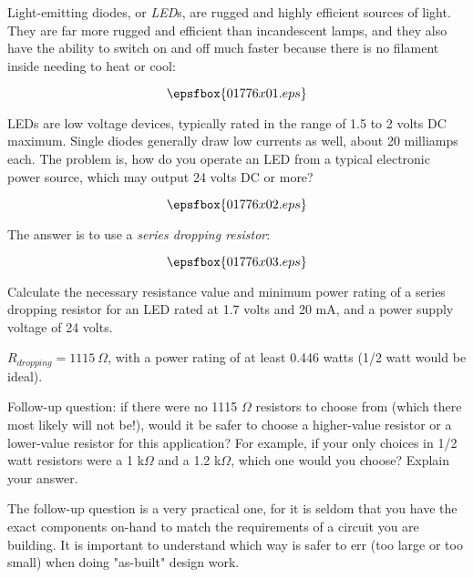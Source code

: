 

Light-emitting diodes, or {\it LED}s, are rugged and highly efficient sources of light.  They are far more rugged and efficient than incandescent lamps, and they also have the ability to switch on and off much faster because there is no filament inside needing to heat or cool:

$$\epsfbox{01776x01.eps}$$

LEDs are low voltage devices, typically rated in the range of 1.5 to 2 volts DC maximum.  Single diodes generally draw low currents as well, about 20 milliamps each.  The problem is, how do you operate an LED from a typical electronic power source, which may output 24 volts DC or more?

$$\epsfbox{01776x02.eps}$$

The answer is to use a {\it series dropping resistor}:

$$\epsfbox{01776x03.eps}$$

Calculate the necessary resistance value and minimum power rating of a series dropping resistor for an LED rated at 1.7 volts and 20 mA, and a power supply voltage of 24 volts.







$R_{dropping} = 1115 \> \Omega$, with a power rating of at least 0.446 watts (1/2 watt would be ideal).

\vskip 10pt

Follow-up question: if there were no 1115 $\Omega$ resistors to choose from (which there most likely will not be!), would it be safer to choose a higher-value resistor or a lower-value resistor for this application?  For example, if your only choices in 1/2 watt resistors were a 1 k$\Omega$ and a 1.2 k$\Omega$, which one would you choose?  Explain your answer.







The follow-up question is a very practical one, for it is seldom that you have the exact components on-hand to match the requirements of a circuit you are building.  It is important to understand which way is safer to err (too large or too small) when doing "as-built" design work.




